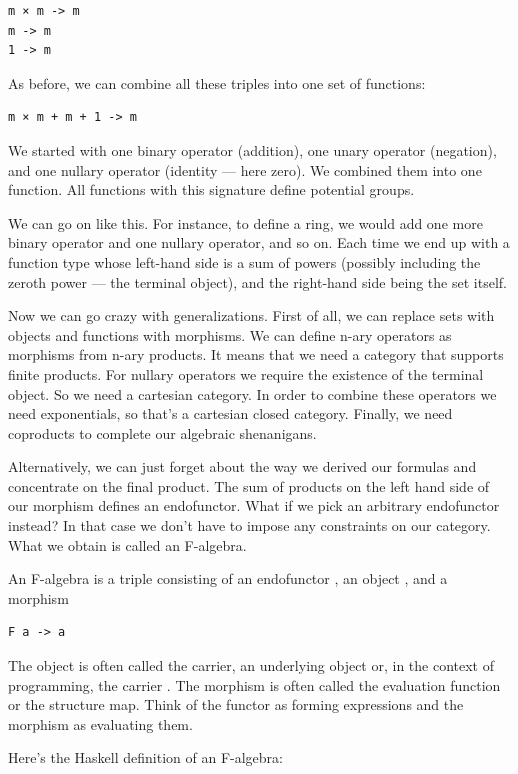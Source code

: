 \begin{verbatim}
m × m -> m
m -> m
1 -> m
\end{verbatim}
As before, we can combine all these triples into one set of functions:

\begin{verbatim}
m × m + m + 1 -> m
\end{verbatim}
We started with one binary operator (addition), one unary operator
(negation), and one nullary operator (identity --- here zero). We
combined them into one function. All functions with this signature
define potential groups.

We can go on like this. For instance, to define a ring, we would add one
more binary operator and one nullary operator, and so on. Each time we
end up with a function type whose left-hand side is a sum of powers
(possibly including the zeroth power --- the terminal object), and the
right-hand side being the set itself.

Now we can go crazy with generalizations. First of all, we can replace
sets with objects and functions with morphisms. We can define n-ary
operators as morphisms from n-ary products. It means that we need a
category that supports finite products. For nullary operators we require
the existence of the terminal object. So we need a cartesian category.
In order to combine these operators we need exponentials, so that's a
cartesian closed category. Finally, we need coproducts to complete our
algebraic shenanigans.

Alternatively, we can just forget about the way we derived our formulas
and concentrate on the final product. The sum of products on the left
hand side of our morphism defines an endofunctor. What if we pick an
arbitrary endofunctor  instead? In that case we don't have to
impose any constraints on our category. What we obtain is called an
F-algebra.

An F-algebra is a triple consisting of an endofunctor , an
object , and a morphism

\begin{verbatim}
F a -> a
\end{verbatim}
The object is often called the carrier, an underlying object or, in the
context of programming, the carrier . The morphism is often
called the evaluation function or the structure map. Think of the
functor  as forming expressions and the morphism as evaluating
them.

Here's the Haskell definition of an F-algebra:

